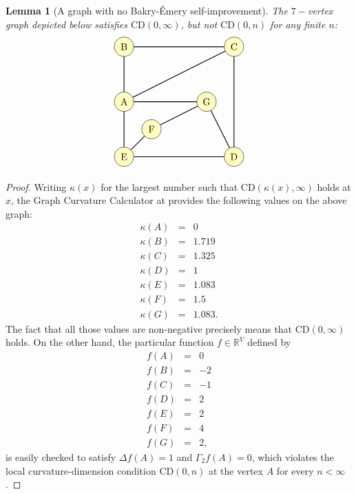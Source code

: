 \documentclass[10pt,a4paper]{amsart}
\newtheorem{lemma}{Lemma}
\newcommand{\dR}{\mathbb {R}}
\newcommand{\CD}{\mathrm{CD}}
\begin{document}
\begin{lemma}[A  graph with no Bakry-\'Emery self-improvement]The $7-$vertex graph  depicted below satisfies  $\CD(0,\infty)$, but not $\CD(0,n)$ for any finite $n$: 
\begin{eqnarray*}
\begin{tikzpicture}[
    vertex/.style={circle, draw, fill=yellow!25, minimum size=20pt, inner sep=0pt},
    edge/.style={draw, thick}
]

\node[vertex] (0) at (6, 4) {C};
\node[vertex] (1) at (2, 0) {E};
\node[vertex] (2) at (5, 2) {G};
\node[vertex] (3) at (2, 4) {B};
\node[vertex] (4) at (3, 1) {F};
\node[vertex] (5) at (6, 0) {D};
\node[vertex] (6) at (2, 2) {A};

\draw[edge] (0) -- (3);
\draw[edge] (0) -- (5);
\draw[edge] (0) -- (6);
\draw[edge] (1) -- (4);
\draw[edge] (1) -- (5);
\draw[edge] (1) -- (6);
\draw[edge] (2) -- (4);
\draw[edge] (2) -- (5);
\draw[edge] (2) -- (6);
\draw[edge] (3) -- (6);

\end{tikzpicture}
\end{eqnarray*}
\end{lemma}

\begin{proof}
Writing $\kappa(x)$ for the  largest number such that $\CD(\kappa(x),\infty)$ holds at  $x$, the Graph Curvature Calculator at \cite{MR4458133} provides the following values on the above graph:
\begin{eqnarray*}
\kappa(A) & = & 0 \\ 
\kappa(B) & = & 1.719\\
\kappa(C) & = & 1.325\\ 
\kappa(D) & = & 1\\
\kappa(E) & = & 1.083\\
\kappa(F) & = & 1.5\\
\kappa(G) & = & 1.083.
\end{eqnarray*}
The fact that all those values are non-negative precisely means that $\CD(0,\infty)$ holds. On the other hand, the particular function $f\in \dR^V$ defined by 
\begin{eqnarray*}
f(A) & = & 0\\
f(B) & = & -2\\
f(C) & = & -1\\
f(D) & = & 2\\
f(E) & = & 2\\
f(F) & = & 4\\
f(G) & = & 2,
\end{eqnarray*}
is easily checked to satisfy $\Delta f(A)=1$ and $\Gamma_2 f(A)=0$, which violates the local curvature-dimension condition $\CD(0,n)$ at the vertex $A$ for every $n<\infty$. 
\end{proof}
\end{document}

